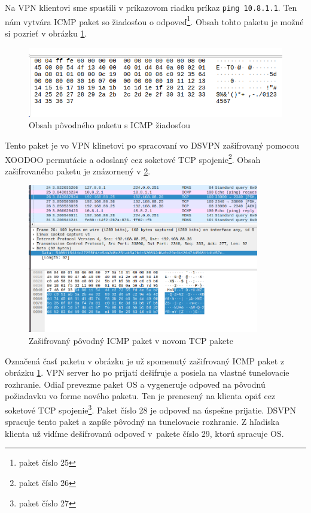 Na VPN klientovi sme spustili v príkazovom riadku príkaz \lstinline|ping 10.8.1.1|. Ten nám vytvára ICMP paket so žiadosťou o odpoveď\footnote{paket číslo 25}. Obsah tohto paketu je možné si pozrieť v obrázku \ref{req}. %
\begin{figure}[h!]
	\centering
	\includegraphics[width=1\textwidth]{figures/req}
	\caption{Obsah pôvodného paketu s ICMP žiadosťou}
	\label{req}
\end{figure}
Tento paket je vo VPN klinetovi po spracovaní vo DSVPN zašifrovaný pomocou XOODOO permutácie a odoslaný cez soketové TCP spojenie\footnote{paket číslo 26}. Obsah zašifrovaného paketu je znázornený v \ref{sifrovanypaket}. 
\begin{figure}[h!]
	\centering
	\includegraphics[width=0.9\textwidth]{figures/sifrovanypaket}
	\caption{Zašifrovaný pôvodný ICMP paket v novom TCP pakete}
	\label{sifrovanypaket}
\end{figure}
Označená časť paketu v obrázku je už spomenutý zašifrovaný ICMP paket z obrázku \ref{req}. VPN server ho po prijatí dešifruje a posiela na vlastné tunelovacie rozhranie. Odiaľ prevezme paket OS a vygeneruje odpoveď na pôvodnú požiadavku vo forme nového paketu. Ten je prenesený na klienta opäť cez soketové TCP spojenie\footnote{paket číslo 27}. Paket číslo 28 je odpoveď na úspešne prijatie. DSVPN spracuje tento paket a zapíše pôvodný na tunelovacie rozhranie. Z hľadiska klienta už vidíme dešifrovanú odpoveď v~pakete číslo 29, ktorú spracuje OS.

